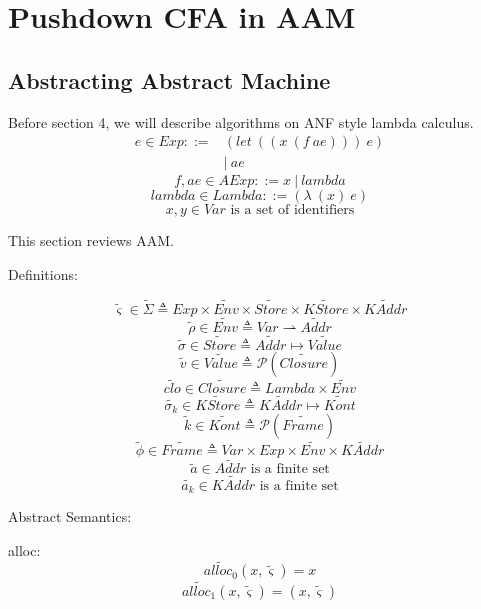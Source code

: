 \documentclass{article}
\begin{document}
\section{Pushdown CFA in AAM}
\label{sec:Pushdown Control Flow Analysis in Abstracting Abstract Machines}
\subsection{Abstracting Abstract Machine}
\label{subs:Abstracting Abstract Machine}
Before section 4, we will describe algorithms on ANF style lambda calculus.
\[
\begin{aligned}
\label{eq:bnf}
e \in Exp ::= {}& (let\ ((x\ (f\ ae)))\ e) {} \\
&|\ ae
\end{aligned}
\]
\[
\tag{atomic expressions}
f, ae \in AExp ::= x\ |\ lambda
\]
\[
\tag{lambda abstractions}
lambda \in Lambda ::= (\lambda\ (x)\ e)
\]
\[
\tag{variables}
x,y \in Var \mbox{ is a set of identifiers}
\]

This section reviews AAM\@.

Definitions:

\[
\tag{states}
\widetilde{\varsigma}\in\widetilde{\Sigma} \triangleq Exp \times \widetilde{Env} \times \widetilde{Store}
\times \widetilde{KStore} \times \widetilde{KAddr}
\]
\[
\tag{environments}
\widetilde{\rho} \in \widetilde{Env} \triangleq Var \rightharpoonup \widetilde{Addr}
\]
\[
\tag{stores}
\widetilde{\sigma} \in \widetilde{Store} \triangleq \widetilde{Addr} \mapsto \widetilde{Value}
\]
\[
\tag{abstract values}
\widetilde{v} \in \widetilde{Value} \triangleq \mathcal{P}(\widetilde{Closure})
\]
\[
\tag{closures}
\widetilde{clo} \in \widetilde{Closure} \triangleq Lambda \times \widetilde{Env}
\]
\[
\tag{continuation stores}
\widetilde{\sigma_k} \in \widetilde{KStore} \triangleq  \widetilde{KAddr} \mapsto  \widetilde{Kont}
\]
\[
\tag{abstract continuations}
\widetilde{k} \in  \widetilde{Kont} \triangleq  \mathcal{P}(\widetilde{Frame})
\]
\[
\tag{stack frames}
\widetilde{\phi} \in  \widetilde{Frame} \triangleq Var \times Exp \times  \widetilde{Env} \times  \widetilde{KAddr}
\]
\[
\tag{value addresses}
\widetilde{a} \in \widetilde{Addr} \mbox{ is a finite set}
\]
\[
\tag{continuation addresses}
\widetilde{a_k} \in \widetilde{KAddr} \mbox{ is a finite set}
\]

Abstract Semantics:

alloc:
\[
\widetilde{alloc_0} (x, \widetilde{\varsigma}) = x
\]
\[
\widetilde{alloc_1} (x, \widetilde{\varsigma}) = (x, \widetilde{\varsigma})
\]
\end{document}
